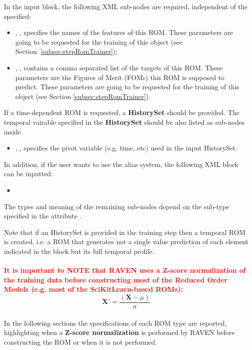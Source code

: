 In the  input block, the following XML sub-nodes are required,
independent of the  specified:
%
\begin{itemize}
   \item {}, ,
     specifies the names of the features of this ROM.
   \nb These parameters are going to be requested for the training of this object
    (see Section~\ref{subsec:stepRomTrainer});
    \item {}, ,
      contains a comma separated list of the targets of this ROM. These parameters
      are the Figures of Merit (FOMs) this ROM is supposed to predict.
    \nb These parameters are going to be requested for the training of this
    object (see Section \ref{subsec:stepRomTrainer}).
\end{itemize}

If a time-dependent ROM is requested, a \textbf{HistorySet} should be provided.
The temporal vairable specified in the \textbf{HistorySet} should be also listed
as sub-nodes inside 
%
\begin{itemize}
  \item {}, , specifies the pivot
    variable (e.g. time, etc) used in the input HistorySet.
\end{itemize}
%
In addition, if the user wants to use the alias system, the following XML block can be inputted:
\begin{itemize}
  \item {}
\end{itemize}


The types and meaning of the remaining sub-nodes depend on the sub-type
specified in the attribute .

%
Note that if an HistorySet is provided in the training step then a temporal ROM is created, i.e. a ROM that generates not a single value prediction of each element indicated in the   block but its full temporal profile.
\\
\textcolor{red}{\\\textbf{It is important to NOTE that RAVEN uses a Z-score normalization of the training data before constructing most of the
Reduced Order Models (e.g. most of the SciKitLearn-based ROMs):}}
\begin{equation}
  \mathit{\mathbf{X'}} = \frac{(\mathit{\mathbf{X}}-\mu )}{\sigma }
\end{equation}
\\In the following sections the specifications of each ROM type are reported, highlighting when a \textbf{Z-score normalization} is performed by RAVEN before constructing the ROM or when it is not performed.


